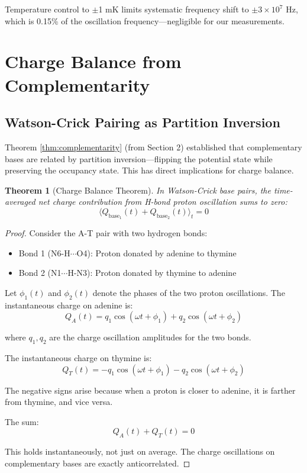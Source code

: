 \documentclass[twocolumn,10pt]{article}
\newtheorem{theorem}{Theorem}[section]
\theoremstyle{remark}
\begin{document}
Temperature control to $\pm$1 mK limits systematic frequency shift to $\pm 3 \times 10^{7}$ Hz, which is 0.15\% of the oscillation frequency---negligible for our measurements.

\section{Charge Balance from Complementarity}

\subsection{Watson-Crick Pairing as Partition Inversion}

Theorem \ref{thm:complementarity} (from Section 2) established that complementary bases are related by partition inversion---flipping the potential state while preserving the occupancy state. This has direct implications for charge balance.

\begin{theorem}[Charge Balance Theorem]
\label{thm:charge_balance}
In Watson-Crick base pairs, the time-averaged net charge contribution from H-bond proton oscillation sums to zero:
\begin{equation}
\langle Q_{\mathrm{base}_1}(t) + Q_{\mathrm{base}_2}(t) \rangle_t = 0
\end{equation}
\end{theorem}

\begin{proof}
Consider the A-T pair with two hydrogen bonds:
\begin{itemize}
\item Bond 1 (N6-H$\cdots$O4): Proton donated by adenine to thymine
\item Bond 2 (N1$\cdots$H-N3): Proton donated by thymine to adenine
\end{itemize}

Let $\phi_1(t)$ and $\phi_2(t)$ denote the phases of the two proton oscillations. The instantaneous charge on adenine is:
\begin{equation}
Q_A(t) = q_1 \cos(\omega t + \phi_1) + q_2 \cos(\omega t + \phi_2)
\end{equation}

where $q_1, q_2$ are the charge oscillation amplitudes for the two bonds.

The instantaneous charge on thymine is:
\begin{equation}
Q_T(t) = -q_1 \cos(\omega t + \phi_1) - q_2 \cos(\omega t + \phi_2)
\end{equation}

The negative signs arise because when a proton is closer to adenine, it is farther from thymine, and vice versa.

The sum:
\begin{equation}
Q_A(t) + Q_T(t) = 0
\end{equation}

This holds instantaneously, not just on average. The charge oscillations on complementary bases are exactly anticorrelated.
\end{proof}
\end{document}
